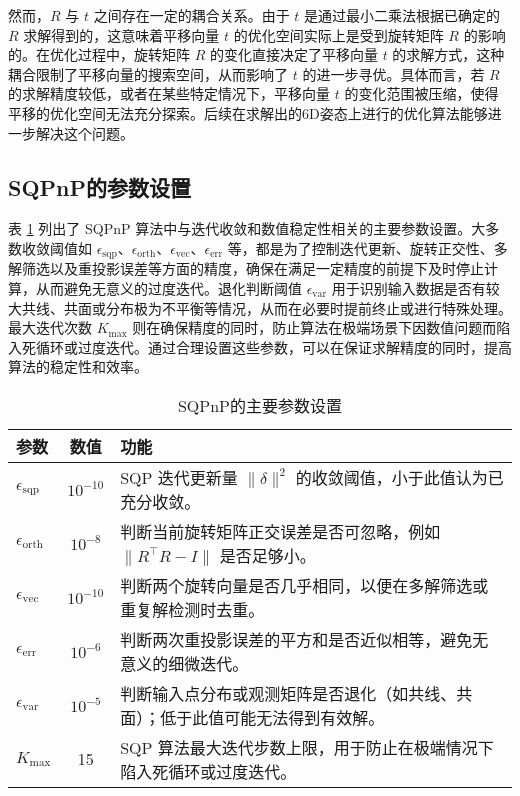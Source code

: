 然而，$R$ 与 $t$ 之间存在一定的耦合关系。由于 $t$ 是通过最小二乘法根据已确定的 $R$ 求解得到的，这意味着平移向量 $t$ 的优化空间实际上是受到旋转矩阵 $R$ 的影响的。在优化过程中，旋转矩阵 $R$ 的变化直接决定了平移向量 $t$ 的求解方式，这种耦合限制了平移向量的搜索空间，从而影响了 $t$ 的进一步寻优。具体而言，若 $R$ 的求解精度较低，或者在某些特定情况下，平移向量 $t$ 的变化范围被压缩，使得平移的优化空间无法充分探索。后续在求解出的6D姿态上进行的优化算法能够进一步解决这个问题。
\subsection{SQPnP的参数设置}
表 \ref{tab:sqpnp-params} 列出了 SQPnP 算法中与迭代收敛和数值稳定性相关的主要参数设置。大多数收敛阈值如 \(\epsilon_{\mathrm{sqp}}\)、\(\epsilon_{\mathrm{orth}}\)、\(\epsilon_{\mathrm{vec}}\)、\(\epsilon_{\mathrm{err}}\) 等，都是为了控制迭代更新、旋转正交性、多解筛选以及重投影误差等方面的精度，确保在满足一定精度的前提下及时停止计算，从而避免无意义的过度迭代。退化判断阈值 \(\epsilon_{\mathrm{var}}\) 用于识别输入数据是否有较大共线、共面或分布极为不平衡等情况，从而在必要时提前终止或进行特殊处理。最大迭代次数 \(K_{\mathrm{max}}\) 则在确保精度的同时，防止算法在极端场景下因数值问题而陷入死循环或过度迭代。通过合理设置这些参数，可以在保证求解精度的同时，提高算法的稳定性和效率。
\begin{table}[htbp]
	\centering
	\caption{SQPnP的主要参数设置}
	\label{tab:sqpnp-params}
	\begin{tabular}{l c p{7.5cm}}
		\toprule
		\textbf{参数} & \textbf{数值} & \textbf{功能} \\
		\midrule
		
		$\epsilon_{\mathrm{sqp}}$      & $10^{-10}$ & 
		SQP 迭代更新量 $\|\delta\|^2$ 的收敛阈值，小于此值认为已充分收敛。\\[3pt]
		
		$\epsilon_{\mathrm{orth}}$     & $10^{-8}$  & 
		判断当前旋转矩阵正交误差是否可忽略，例如 $\|R^\top R - I\|$ 是否足够小。\\[3pt]
		
		$\epsilon_{\mathrm{vec}}$      & $10^{-10}$ &
		判断两个旋转向量是否几乎相同，以便在多解筛选或重复解检测时去重。\\[3pt]
		
		$\epsilon_{\mathrm{err}}$      & $10^{-6}$  &
		判断两次重投影误差的平方和是否近似相等，避免无意义的细微迭代。\\[3pt]
		
		$\epsilon_{\mathrm{var}}$      & $10^{-5}$  &
		判断输入点分布或观测矩阵是否退化（如共线、共面）；低于此值可能无法得到有效解。\\[3pt]
		
		$K_{\mathrm{max}}$             & 15         &
		SQP 算法最大迭代步数上限，用于防止在极端情况下陷入死循环或过度迭代。\\
		\bottomrule
	\end{tabular}
\end{table}



